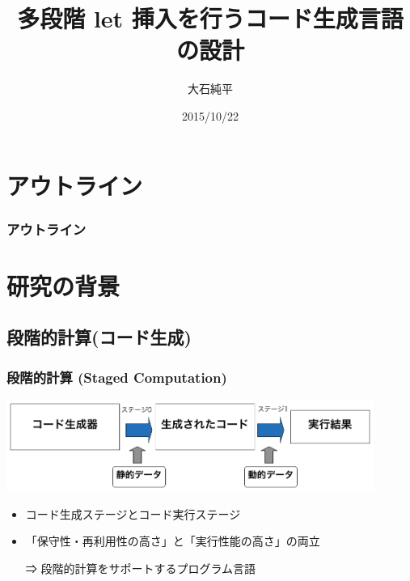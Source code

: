 \documentclass[dvipdfmx,cjk,xcolor=dvipsnames,envcountsect,notheorems,12pt,handout]{beamer} \usepackage{pgfpages} \pgfpagesuselayout{4 on 1}[a4paper,landscape,border shrink=5mm]
\title{多段階 let 挿入を行うコード生成言語の設計}
\author{大石純平}
\institute[筑波大学 プログラム論理研究室]{筑波大学 大学院 \\ プログラム論理研究室}%
\date{2015/10/22}
\theoremstyle{definition}
\begin{document}
\frame[plain]{\titlepage}%

\section*{アウトライン}

\begin{frame}
  \frametitle{アウトライン}
  \tableofcontents[sectionstyle=show,subsectionstyle=hide]
\end{frame}

\section{研究の背景}

\subsection{段階的計算(コード生成)}

\begin{frame}
  \frametitle{段階的計算 (Staged Computation)}
  \includegraphics[clip,width=12cm]{./img/prggen.png}

  \begin{itemize}
  \item コード生成ステージとコード実行ステージ
  \item 「保守性・再利用性の高さ」と「実行性能の高さ」の両立
  \item[⇒] 段階的計算をサポートするプログラム言語
  \end{itemize}
\end{frame}

\end{document}
